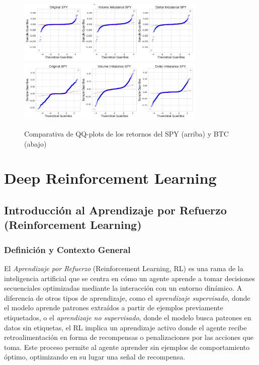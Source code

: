 \documentclass[a4paper,12pt, twoside]{report}
\begin{document}
\begin{figure}[H]
    \centering
    \includegraphics[width=0.8\textwidth]{figures/SPY_qq_comparison.png}
    \includegraphics[width=0.8\textwidth]{figures/BTC_qq_comparison.png}
    \caption{Comparativa de QQ-plots de los retornos del SPY (arriba) y BTC (abajo)}
    \label{fig:qqplot_comparison}
\end{figure}

\chapter{Deep Reinforcement Learning}

\section{Introducción al Aprendizaje por Refuerzo (Reinforcement Learning)}

\subsection{Definición y Contexto General}

El \textit{Aprendizaje por Refuerzo} (Reinforcement Learning, RL) es una rama de la inteligencia 
artificial que se centra en cómo un agente aprende a tomar decisiones secuenciales optimizadas 
mediante la interacción con un entorno dinámico. A diferencia de otros tipos de aprendizaje, como 
el \textit{aprendizaje supervisado}, donde el modelo aprende patrones extraídos a partir de ejemplos 
previamente etiquetados, o el \textit{aprendizaje no supervisado}, donde el modelo busca patrones 
en datos sin etiquetas, el RL implica un aprendizaje activo donde el agente recibe retroalimentación 
en forma de recompensas o penalizaciones por las acciones que toma. Este proceso permite al 
agente aprender sin ejemplos de comportamiento óptimo, optimizando en su lugar una señal de recompensa.
\end{document}
